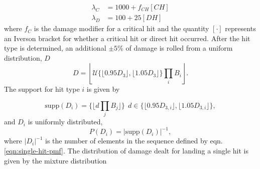 \documentclass{article}
\begin{document}
    \begin{equation}
        \begin{split}
            \lambda_C &= 1000 + f_{CH}[CH] \\
            \lambda_D &= 100 + 25[DH]
        \end{split}
    \end{equation}
    where $f_C$ is the damage modifier for a critical hit and the quantity $[\cdot]$ represents an Iverson bracket for whether a critical hit or direct hit occurred. After the hit type is determined, an additional $\pm 5\%$ of damage is rolled from a uniform distribution, $D$
    \begin{equation}\label{eqn:final-dmg}
        D = \left\lfloor \mathcal{U}\{ \lfloor 0.95 D_3 \rfloor, \lfloor 1.05 D_3  \rfloor \} \prod_{i}B_i \right\rfloor.
    \end{equation}
    The support for hit type $i$ is given by

    \begin{equation}\label{eqn:supp}
        \textrm{supp}(D_i) = \{\lfloor d  \prod_j B_j \rfloor \}
        \:\: d \in \{\lfloor 0.95 D_{3,i} \rfloor, \lfloor 1.05 D_{3,i} \rfloor \},   
    \end{equation}
    and $D_i$ is uniformly distributed,
    \begin{equation}\label{eqn:single-hit-pmf}
        P(D_i) = \left|\textrm{supp}(D_i) \right|^{-1},
    \end{equation}
    where $\left|D_i \right|^{-1}$ is the number of elements in the sequence defined by eqn. \ref{eqn:single-hit-pmf}. The distribution of damage dealt for landing a single hit is given by the mixture distribution
\end{document}
